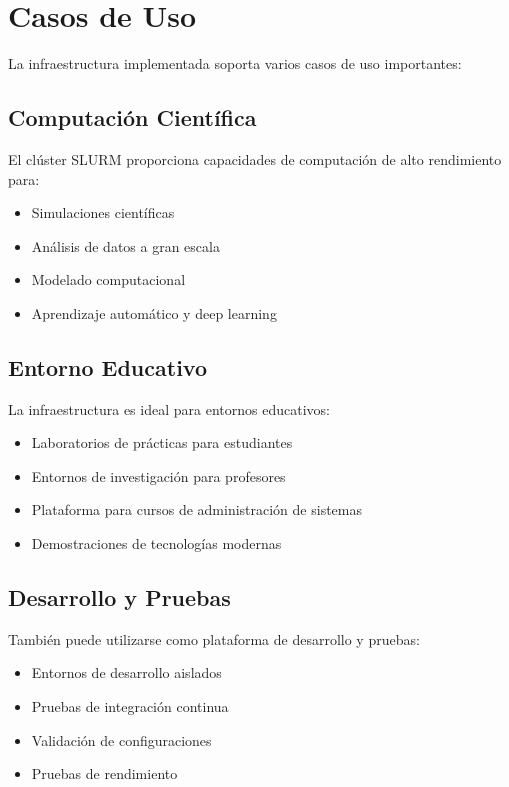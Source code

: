 \documentclass[12pt,a4paper]{article}
\begin{document}
\section{Casos de Uso}
\newpage

La infraestructura implementada soporta varios casos de uso importantes:

\subsection{Computación Científica}

El clúster SLURM proporciona capacidades de computación de alto rendimiento para:

\begin{itemize}[leftmargin=*]
    \item Simulaciones científicas
    \item Análisis de datos a gran escala
    \item Modelado computacional
    \item Aprendizaje automático y deep learning
\end{itemize}

\subsection{Entorno Educativo}

La infraestructura es ideal para entornos educativos:

\begin{itemize}[leftmargin=*]
    \item Laboratorios de prácticas para estudiantes
    \item Entornos de investigación para profesores
    \item Plataforma para cursos de administración de sistemas
    \item Demostraciones de tecnologías modernas
\end{itemize}

\subsection{Desarrollo y Pruebas}

También puede utilizarse como plataforma de desarrollo y pruebas:

\begin{itemize}[leftmargin=*]
    \item Entornos de desarrollo aislados
    \item Pruebas de integración continua
    \item Validación de configuraciones
    \item Pruebas de rendimiento
\end{itemize}
\end{document}

